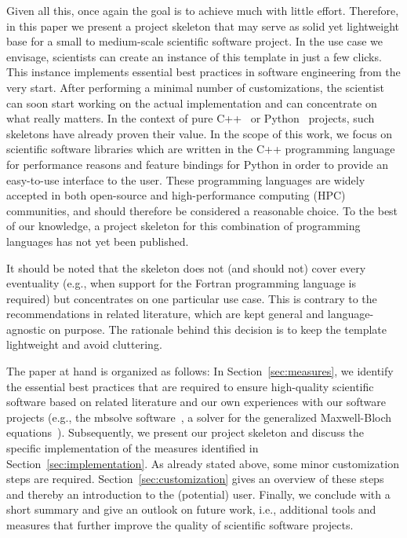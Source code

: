 \documentclass[@CLASSOPTIONS@]{tumarticle}
\begin{document}
Given all this, once again the goal is to achieve much with little effort.
Therefore, in this paper we present a project skeleton that may serve as
solid yet lightweight base for a small to medium-scale scientific software
project. In the use case we envisage, scientists can create an instance of
this template in just a few clicks. This instance implements essential best
practices in software engineering from the very start. After performing a
minimal number of customizations, the scientist can soon start working on the
actual implementation and can concentrate on what really matters. In the
context of pure C++~\cite{kracejic2015} or Python~\cite{ioannides2018}
projects, such skeletons have already proven their value. In the scope of
this work, we focus on scientific software libraries which are written in the
C++ programming language for performance reasons and feature bindings for
Python in order to provide an easy-to-use interface to the user. These
programming languages are widely accepted in both open-source and
high-performance computing (HPC) communities, and should therefore be
considered a reasonable choice. To the best of our knowledge, a project
skeleton for this combination of programming languages has not yet been
published.

It should be noted that the skeleton does not (and should not) cover every
eventuality (e.g., when support for the Fortran programming language is
required) but concentrates on one particular use case. This is contrary to
the recommendations in related literature, which are kept general and
language-agnostic on purpose. The rationale behind this decision is to keep
the template lightweight and avoid cluttering.

The paper at hand is organized as follows: In Section~\ref{sec:measures}, we
identify the essential best practices that are required to ensure
high-quality scientific software based on related literature and our own
experiences with our software projects (e.g., the mbsolve
software~\cite{riesch2018oqel,mbsolve-github}, a solver for the generalized
Maxwell-Bloch equations~\cite{jirauschek2019ats}). Subsequently, we present
our project skeleton and discuss the specific implementation of the
measures identified in Section~\ref{sec:implementation}. As already stated
above, some minor customization steps are required.
Section~\ref{sec:customization} gives an overview of these steps and thereby
an introduction to the (potential) user. Finally, we conclude with a short
summary and give an outlook on future work, i.e., additional tools and
measures that further improve the quality of scientific software projects.
\end{document}
